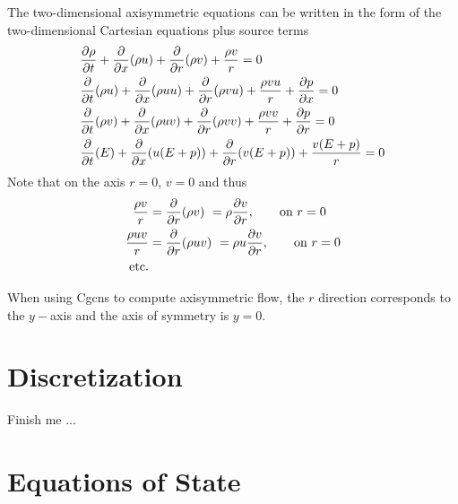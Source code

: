 \documentclass{article}
\begin{document}
The two-dimensional axisymmetric equations can be written in the form of the two-dimensional Cartesian equations plus source
terms
\begin{align}
 & {\partial \rho\over\partial t} + {\partial \over\partial x}( \rho u ) + {\partial \over\partial r}(\rho v ) 
            +   \frac{\rho v}{r}   = 0\\
 &  {\partial \over\partial t}(\rho u)  + {\partial \over\partial x}( \rho u u ) + {\partial \over\partial r}(\rho v u ) 
            +  \frac{\rho v u}{r}   + {\partial p \over\partial x} = 0 \\ 
 &  {\partial \over\partial t}(\rho v) + {\partial \over\partial x}( \rho u v ) + {\partial \over\partial r}(\rho v v ) 
           +  \frac{\rho v v}{r}    + {\partial p \over\partial r} = 0 \\ 
 &  {\partial\over\partial t}(E)  + {\partial \over\partial x}( u (E+p) ) + {\partial \over\partial r}(v (E+p) ) 
            +  \frac{v (E+p)}{r}    = 0
\end{align}
Note that on the axis $r=0$, $v=0$ and thus
\begin{align}
    \frac{\rho v}{r} &= {\partial \over\partial r}(\rho v ) ~= \rho {\partial v \over\partial r}, \qquad \text{on $r=0$} \\
    \frac{\rho u v}{r} &= {\partial \over\partial r}(\rho u v ) ~= \rho u {\partial v \over\partial r}, \qquad \text{on $r=0$} \\
     \text{etc.} & 
\end{align}

When using Cgcns to compute axisymmetric flow, the $r$ direction corresponds to the $y-$axis and the axis of symmetry
is $y=0$. 

\section{ Discretization}

Finish me ...





\clearpage
\section{Equations of State}
\end{document}
